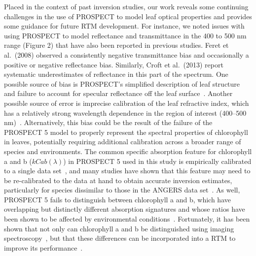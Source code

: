 Placed in the context of past inversion studies, our work reveals some continuing challenges in the use of PROSPECT to model leaf optical properties and provides some guidance for future RTM development.
For instance, we noted issues with using PROSPECT to model reflectance and transmittance in the 400 to 500 nm range (Figure 2) that have also been reported in previous studies. %
Feret et al.~(2008) observed a consistently negative transmittance bias and occasionally a positive or negative reflectance bias. \nocite{feret_2008_prospect}
Similarly, Croft et al.~(2013) report systematic underestimates of reflectance in this part of the spectrum. \nocite{croft_2013_modelling}
One possible source of bias is PROSPECT’s simplified description of leaf structure~\cite{jacquemoud_1990_prospect} and failure to account for specular reflectance off the leaf surface~\cite{grant_1987_diffuse}.
Another possible source of error is imprecise calibration of the leaf refractive index, which has a relatively strong wavelength dependence in the region of interest (400--500 nm)~\cite{feret_2008_prospect}.
Alternatively, this bias could be the result of the failure of the PROSPECT 5 model to properly represent the spectral properties of chlorophyll in leaves, potentially requiring additional calibration across a broader range of species and environments.
The common specific absorption feature for chlorophyll a and b ($kCab(\lambda)$) in PROSPECT 5 used in this study is empirically calibrated to a single data set~\cite[ANGERS; ]{feret_2008_prospect},
and many studies have shown that this feature may need to be re-calibrated to the data at hand to obtain accurate inversion estimates,
particularly for species dissimilar to those in the ANGERS data set~\cite{malenovsky_2006_applicability,moorthy_2008_estimating,zhang_2008_retrieving,li_2013_retrieval}.
As well, PROSPECT 5 fails to distinguish between chlorophyll a and b, which have overlapping but distinctly different absorption signatures and whose ratios have been shown to be affected by environmental conditions~\cite{blackburn_2006_hyperspectral,divittorio_2009_spectral,divittorio_2009_enhancing}.
Fortunately, it has been shown that not only can chlorophyll a and b be distinguished using imaging spectroscopy~\cite{divittorio_2009_pigment}, but that these differences can be incorporated into a RTM to improve its performance~\cite{divittorio_2009_enhancing}.

